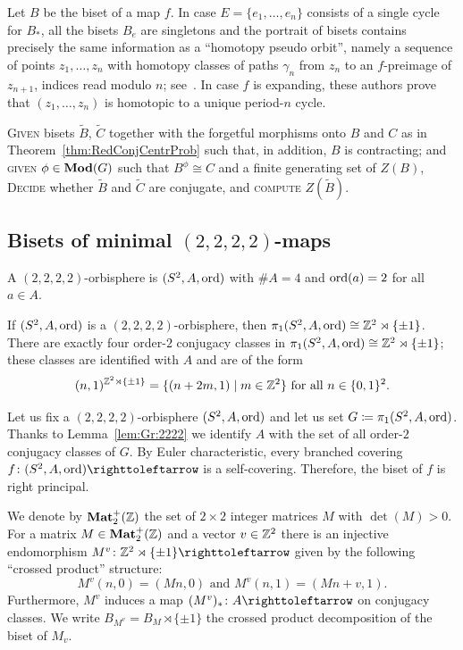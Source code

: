 \documentclass{amsart}
\begin{document}
Let $B$ be the biset of a map $f$. In case $E=\{e_1,\dots,e_n\}$
consists of a single cycle for $B_*$, all the bisets $B_e$ are
singletons and the portrait of bisets contains precisely the same
information as a ``homotopy pseudo orbit'', namely a sequence of
points $z_1,\dots,z_n$ with homotopy classes of paths $\gamma_n$ from
$z_n$ to an $f$-preimage of $z_{n+1}$, indices read modulo $n$;
see~\cite{ishii-smillie:shadowing}. In case $f$ is expanding, these
authors prove that $(z_1,\dots,z_n)$ is homotopic to a unique
period-$n$ cycle.

\begin{algo}\label{algo:erase}
  \textsc{Given} bisets $\widetilde B$, $\widetilde C$ together with
  the forgetful morphisms onto $B$ and $C$ as in
  Theorem~\ref{thm:RedConjCentrProb} such that, in addition, $B$ is
  contracting; and \textsc{given} $\phi\in\mathbf{\relax Mod}(G)$ such that $B^\phi\cong C$ and a finite generating set of $Z(B)$,\\
  \textsc{Decide} whether $\widetilde B$ and $\widetilde C$ are
  conjugate, and \textsc{compute} $Z(\widetilde B)$.
\end{algo}

\subsection{\myboldmath Bisets of minimal $(2,2,2,2)$-maps}\label{ss:lattes}
A $(2,2,2,2)$-orbisphere is $(S^2,A, \operatorname{ord})$ with $\#A=4$ and
$\operatorname{ord}(a)=2$ for all $a\in A$.

\begin{lem}\label{lem:Gr:2222}
  If $(S^2,A, \operatorname{ord})$ is a $(2,2,2,2)$-orbisphere, then $\pi_1(S^2,A,
  \operatorname{ord}) \cong {\mathbb Z}^2\rtimes\{\pm1\}$. There are exactly four
  order-$2$ conjugacy classes in $ \pi_1(S^2,A, \operatorname{ord}) \cong
  {\mathbb Z}^2\rtimes\{\pm1\}$; these classes are identified with $A$ and
  are of the form
\[(n,1)^{ {\mathbb Z}^2\rtimes\{\pm1\}}=\{(n+2m,1)\mid m\in {\mathbb Z}^2\} \text{ for all }n\in\{0,1\}^2.\]
\end{lem}

Let us fix a $(2,2,2,2)$-orbisphere $(S^2,A, \operatorname{ord})$ and let us set
$G\coloneqq \pi_1(S^2,A, \operatorname{ord})$. Thanks to Lemma~\ref{lem:Gr:2222} we
identify $A$ with the set of all order-$2$ conjugacy classes of
$G$. By Euler characteristic, every branched covering $f\colon (S^2,A,
\ord) \selfmap$ is a self-covering. Therefore, the biset of $f$ is
right principal.
 
We denote by $\mathbf{Mat}_2^+({\mathbb Z})$ the set of $2\times2$ integer matrices $M$
with $\det(M)>0$. For a matrix $M\in \mathbf{Mat}^+_2({\mathbb Z})$ and a vector
$v\in {\mathbb Z}^2$ there is an injective endomorphism
$M^v\colon \Z^2\rtimes\{\pm1\} \selfmap$ given by the following
``crossed product'' structure:
\begin{equation}
\label{eq:InjEndOfK}
M^{v}(n,0)=(Mn,0) \text{ and }M^{v}(n,1)=(Mn+v,1).
\end{equation}  
Furthermore, $M^v$ induces a map $(M^v)_*\colon A \selfmap$ on
conjugacy classes. We write $B_{M^v}=B_M\rtimes\{\pm1\}$ the crossed
product decomposition of the biset of $M_v$.
 
\end{document}
